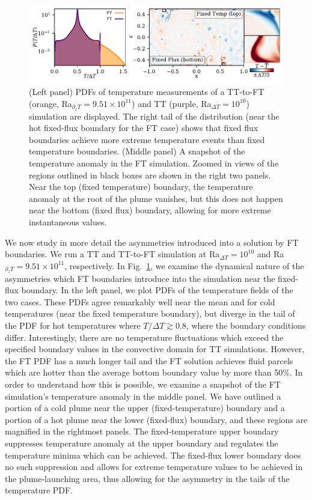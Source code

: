 \documentclass[aps, pre, onecolumn, nofootinbib, notitlepage, groupedaddress, amsfonts, amssymb, amsmath, longbibliography, superscriptaddress]{revtex4-1}
\begin{document}
\begin{figure}
\includegraphics[width=\textwidth]{./figs/rbc_dynamics_asymmetries.pdf}
\caption{ 
	(Left panel) PDFs of temperature measurements of a TT-to-FT (orange, Ra$_{\partial_z T} = 9.51 \times 10^{11}$) and TT (purple, Ra$_{\Delta T} = 10^{10}$) simulation are displayed.
	The right tail of the distribution (near the hot fixed-flux boundary for the FT case) shows that fixed flux boundaries achieve more extreme temperature events than fixed temperature boundaries.
	(Middle panel) A snapshot of the temperature anomaly in the FT simulation.
	Zoomed in views of the regions outlined in black boxes are shown in the right two panels.
	Near the top (fixed temperature) boundary, the temperature anomaly at the root of the plume vanishes, but this does not happen near the bottom (fixed flux) boundary, allowing for more extreme instantaneous values.
\label{fig:rbc_dynamics_asymmetries} }
\end{figure}

We now study in more detail the asymmetries introduced into a solution by FT boundaries.
We run a TT and TT-to-FT simulation at Ra$_{\Delta T} = 10^{10}$ and Ra$_{\partial_z T} = 9.51 \times 10^{11}$, respectively.
In Fig.~\ref{fig:rbc_dynamics_asymmetries}, we examine the dynamical nature of the asymmetries which FT boundaries introduce into the simulation near the fixed-flux boundary.
In the left panel, we plot PDFs of the temperature fields of the two cases.
These PDFs agree remarkably well near the mean and for cold temperatures (near the fixed temperature boundary), but diverge in the tail of the PDF for hot temperatures where $T/\Delta T \gtrsim 0.8$, where the boundary conditions differ.
Interestingly, there are no temperature fluctuations which exceed the specified boundary values in the convective domain for TT simulations.
However, the FT PDF has a much longer tail and the FT solution achieves fluid parcels which are hotter than the average bottom boundary value by more than 50\%.
In order to understand how this is possible, we examine a snapshot of the FT simulation's temperature anomaly in the middle panel.
We have outlined a portion of a cold plume near the upper (fixed-temperature) boundary and a portion of a hot plume near the lower (fixed-flux) boundary, and these regions are magnified in the rightmost panels.
The fixed-temperature upper boundary suppresses temperature anomaly at the upper boundary and regulates the temperature minima which can be achieved.
The fixed-flux lower boundary does no such suppression and allows for extreme temperature values to be achieved in the plume-launching area, thus allowing for the asymmetry in the tails of the temperature PDF.
\end{document}
